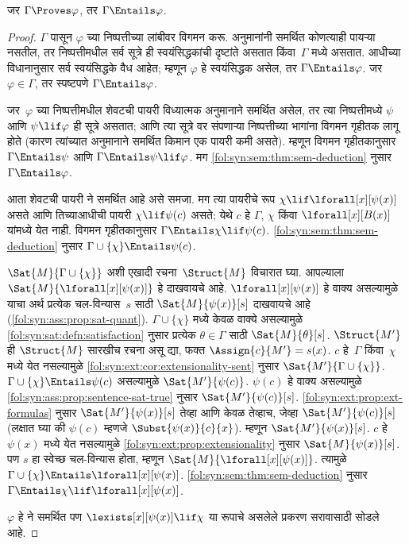 \begin{thm}[निर्दोषता]
\label{fol:axd:sou:thm:soundness}
जर $\Gamma \Proves \varphi$, तर $\Gamma \Entails \varphi$.
\end{thm}

\begin{proof}
$\Gamma$ पासून $\varphi$ च्या निष्पत्तीच्या लांबीवर विगमन करू. अनुमानांनी
समर्थित कोणत्याही पायऱ्या नसतील, तर निष्पत्तीमधील सर्व सूत्रे
ही स्वयंसिद्धकांची दृष्टांते असतात किंवा~$\Gamma$ मध्ये असतात. आधीच्या
विधानानुसार सर्व स्वयंसिद्धके वैध आहेत;
म्हणून $\varphi$ हे स्वयंसिद्धक असेल, तर $\Gamma \Entails \varphi$. जर
$\varphi \in \Gamma$, तर स्पष्टपणे $\Gamma \Entails \varphi$.

जर~$\varphi$ च्या निष्पत्तीमधील शेवटची पायरी विध्यात्मक अनुमानाने समर्थित
असेल, तर त्या निष्पत्तीमध्ये $\psi$ आणि $\psi \lif \varphi$ ही सूत्रे
असतात; आणि त्या सूत्रे वर संपणाऱ्या निष्पत्तीच्या भागांना विगमन
गृहीतक लागू होते (कारण त्यांच्यात अनुमानाने समर्थित किमान एक पायरी कमी
असते). म्हणून विगमन गृहीतकानुसार $\Gamma \Entails \psi$ आणि
$\Gamma \Entails \psi \lif \varphi$. मग
\ref{fol:syn:sem:thm:sem-deduction}
नुसार $\Gamma \Entails \varphi$.

आता शेवटची पायरी \QR ने समर्थित आहे असे समजा. मग त्या पायरीचे
रूप $\chi \lif \lforall[x][\psi(x)]$ असते आणि तिच्याआधीची पायरी
$\chi \lif \psi(c)$ असते; येथे $c$ हे $\Gamma$, $\chi$ किंवा
$\lforall[x][B(x)]$ यांमध्ये येत नाही. विगमन गृहीतकानुसार
$\Gamma \Entails \chi \lif \psi(c)$.
\ref{fol:syn:sem:thm:sem-deduction} नुसार $\Gamma \cup \{\chi\} \Entails
\psi(c)$.


$\Sat{M}{\Gamma \cup
  \{\chi\}}$ अशी एखादी रचना~$\Struct{M}$ विचारात घ्या. आपल्याला
$\Sat{M}{\lforall[x][\psi(x)]}$ हे दाखवायचे आहे.
$\lforall[x][\psi(x)]$ हे वाक्य असल्यामुळे याचा अर्थ प्रत्येक
चल-विन्यास~$s$ साठी $\Sat{M}{\psi(x)}[s]$ दाखवायचे आहे
(\ref{fol:syn:ass:prop:sat-quant}). $\Gamma \cup \{\chi\}$ मध्ये केवळ
वाक्ये असल्यामुळे \ref{fol:syn:sat:defn:satisfaction} नुसार प्रत्येक
$\theta \in \Gamma$ साठी $\Sat{M}{\theta}[s]$. $\Struct{M'}$ ही
$\Struct{M}$ सारखीच रचना असू द्या, फक्त $\Assign{c}{M'} = s(x)$.
$c$ हे~$\Gamma$ किंवा~$\chi$ मध्ये येत नसल्यामुळे
\ref{fol:syn:ext:cor:extensionality-sent} नुसार
$\Sat{M'}{\Gamma \cup \{\chi\}}$. $\Gamma \cup \{\chi\}
\Entails \psi(c)$ असल्यामुळे $\Sat{M'}{\psi(c)}$. $\psi(c)$ हे वाक्य
असल्यामुळे \ref{fol:syn:ass:prop:sentence-sat-true} नुसार
$\Sat{M'}{\psi(c)}[s]$. \ref{fol:syn:ext:prop:ext-formulas} नुसार
$\Sat{M'}{\psi(x)}[s]$ तेव्हा आणि केवळ तेव्हाच, जेव्हा
$\Sat{M'}{\psi(c)}[s]$ (लक्षात घ्या की $\psi(c)$ म्हणजे
$\Subst{\psi(x)}{c}{x}$). म्हणून $\Sat{M'}{\psi(x)}[s]$. $c$ हे~$\psi(x)$
मध्ये येत नसल्यामुळे \ref{fol:syn:ext:prop:extensionality} नुसार
$\Sat{M}{\psi(x)}[s]$. पण $s$ हा स्वेच्छ चल-विन्यास होता, म्हणून
$\Sat{M}{\lforall[x][\psi(x)]}$. त्यामुळे $\Gamma \cup \{\chi\} \Entails
\lforall[x][\psi(x)]$. \ref{fol:syn:sem:thm:sem-deduction} नुसार
$\Gamma \Entails \chi \lif \lforall[x][\psi(x)]$.


$\varphi$ हे \QR ने समर्थित पण $\lexists[x][\psi(x)] \lif \chi$ या रूपाचे असलेले
प्रकरण सरावासाठी सोडले आहे.
\end{proof}


